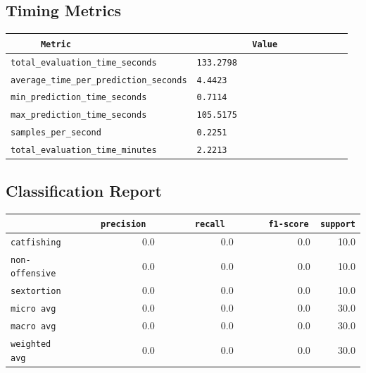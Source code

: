 \documentclass{article}
\begin{document}
\subsection{Timing Metrics}

\begin{center}
\begin{tabular}{l | l} \hline
    \verb|      Metric     | & \verb|           Value           | \\ \hline
    \hline
    \verb|total_evaluation_time_seconds| & \verb|133.2798                     | \\ \hline
    \verb|average_time_per_prediction_seconds| & \verb|4.4423                       | \\ \hline
    \verb|min_prediction_time_seconds| & \verb|0.7114                       | \\ \hline
    \verb|max_prediction_time_seconds| & \verb|105.5175                     | \\ \hline
    \verb|samples_per_second| & \verb|0.2251                       | \\ \hline
    \verb|total_evaluation_time_minutes| & \verb|2.2213                       | \\ \hline
\end{tabular}
\end{center}

\subsection{Classification Report}

\begin{center}
\begin{tabular}{l | r | r | r | r} \hline
    \verb|            | & \verb|    precision     | & \verb|      recall      | & \verb|     f1-score     | & \verb|support| \\ \hline
    \hline
    \verb|catfishing | & 0.0 & 0.0 & 0.0 &    10.0 \\ \hline
    \verb|non-offensive| & 0.0 & 0.0 & 0.0 &    10.0 \\ \hline
    \verb|sextortion | & 0.0 & 0.0 & 0.0 &    10.0 \\ \hline
    \verb|micro avg  | & 0.0 & 0.0 & 0.0 &    30.0 \\ \hline
    \verb|macro avg  | & 0.0 & 0.0 & 0.0 &    30.0 \\ \hline
    \verb|weighted avg| & 0.0 & 0.0 & 0.0 &    30.0 \\ \hline
\end{tabular}
\end{center}
\end{document}
